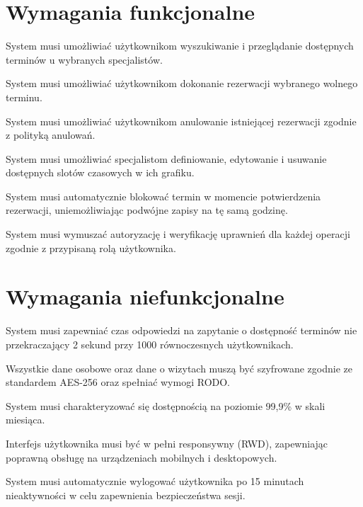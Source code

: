 \documentclass[12pt,a4paper]{article}
\begin{document}
\section{Wymagania funkcjonalne}
\begin{description}[leftmargin=1.8cm, labelwidth=1.3cm, labelsep=0.5cm]
    \item[FR1] System musi umożliwiać użytkownikom wyszukiwanie i przeglądanie dostępnych terminów u wybranych specjalistów.
    \item[FR2] System musi umożliwiać użytkownikom dokonanie rezerwacji wybranego wolnego terminu.
    \item[FR3] System musi umożliwiać użytkownikom anulowanie istniejącej rezerwacji zgodnie z polityką anulowań.
    \item[FR4] System musi umożliwiać specjalistom definiowanie, edytowanie i usuwanie dostępnych slotów czasowych w ich grafiku.
    \item[FR5] System musi automatycznie blokować termin w momencie potwierdzenia rezerwacji, uniemożliwiając podwójne zapisy na tę samą godzinę.
    \item[FR6] System musi wymuszać autoryzację i weryfikację uprawnień dla każdej operacji zgodnie z przypisaną rolą użytkownika.
\end{description}

\section{Wymagania niefunkcjonalne}
\begin{description}[leftmargin=1.8cm, labelwidth=1.3cm, labelsep=0.5cm]
    \item[NFR1] System musi zapewniać czas odpowiedzi na zapytanie o dostępność terminów nie przekraczający 2 sekund przy 1000 równoczesnych użytkownikach.
    \item[NFR2] Wszystkie dane osobowe oraz dane o wizytach muszą być szyfrowane zgodnie ze standardem AES-256 oraz spełniać wymogi RODO.
    \item[NFR3] System musi charakteryzować się dostępnością na poziomie 99,9\% w skali miesiąca.
    \item[NFR4] Interfejs użytkownika musi być w pełni responsywny (RWD), zapewniając poprawną obsługę na urządzeniach mobilnych i desktopowych.
    \item[NFR5] System musi automatycznie wylogować użytkownika po 15 minutach nieaktywności w celu zapewnienia bezpieczeństwa sesji.
\end{description}
\end{document}

